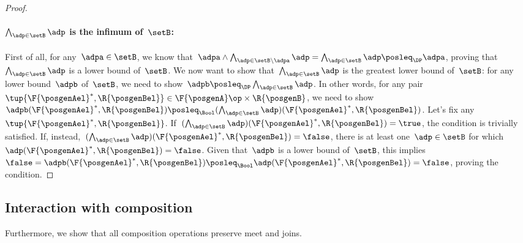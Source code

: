 \begin{proof}
    \paragraph*{$\bigwedge_{\adp \in \setB} \adp$ is the infimum of~$\setB$:}
    First of all, for any~$\adpa\in \setB$, we know that~$\adpa \wedge \bigwedge_{\adp \in \setB \backslash \adpa} \adp= \bigwedge_{\adp \in \setB} \adp \posleq_\DP \adpa$, proving that~$\bigwedge_{\adp \in \setB} \adp$ is a lower bound of~$\setB$.
        We now want to show that~$\bigwedge_{\adp \in \setB} \adp$ is the greatest lower bound of~$\setB$: for any lower bound~$\adpb$ of~$\setB$, we need to show~$\adpb\posleq_\DP\bigwedge_{\adp \in \setB} \adp $.
        In other words, for any pair~$\tup{\F{\posgenAel}^*,\R{\posgenBel}}\in \F{\posgenA}\op\times \R{\posgenB}$, we need to show~$\adpb(\F{\posgenAel}^*,\R{\posgenBel}) \posleq_\Bool (\bigwedge_{\adp \in \setB} \adp)(\F{\posgenAel}^*,\R{\posgenBel})$.
        Let's fix any~$\tup{\F{\posgenAel}^*,\R{\posgenBel}}$. If~$(\bigwedge_{\adp \in \setB} \adp)(\F{\posgenAel}^*,\R{\posgenBel})=\true$, the condition is trivially satisfied.
        If, instead,~$(\bigwedge_{\adp \in \setB} \adp)(\F{\posgenAel}^*,\R{\posgenBel})=\false$, there is at least one~$\adp\in \setB$ for which~$\adp(\F{\posgenAel}^*,\R{\posgenBel})=\false$.
        Given that~$\adpb$ is a lower bound of~$\setB$, this implies~$\false=\adpb(\F{\posgenAel}^*,\R{\posgenBel})\posleq_\Bool \adp(\F{\posgenAel}^*,\R{\posgenBel})=\false$, proving the condition.
\end{proof}


\subsection{Interaction with composition}

Furthermore, we show that all composition operations preserve meet and joins.

